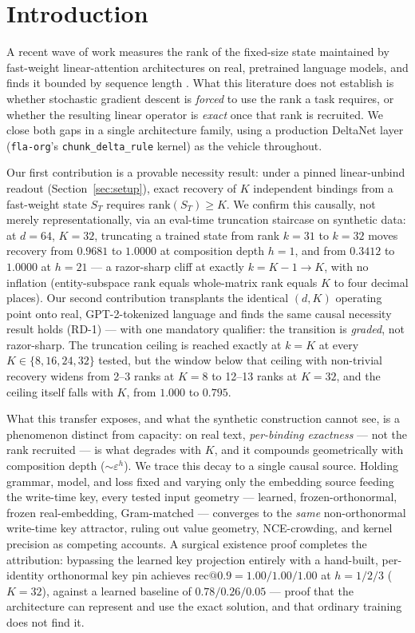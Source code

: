 \section{Introduction}
\label{sec:intro}

A recent wave of work measures the rank of the fixed-size state maintained
by fast-weight linear-attention architectures on real, pretrained language
models, and finds it bounded by sequence length \citep{nazari2026rank,
sun2026staterank}. What this literature does not establish is whether
stochastic gradient descent is \emph{forced} to use the rank a task
requires, or whether the resulting linear operator is \emph{exact} once
that rank is recruited. We close both gaps in a single architecture
family, using a production DeltaNet layer (\texttt{fla-org}'s
\texttt{chunk\_delta\_rule} kernel) as the vehicle throughout.

Our first contribution is a provable necessity result: under a pinned
linear-unbind readout (Section~\ref{sec:setup}), exact recovery of $K$
independent bindings from a fast-weight state $S_T$ requires
$\mathrm{rank}(S_T)\geq K$. We confirm this causally, not merely
representationally, via an eval-time truncation staircase on synthetic
data: at $d{=}64$, $K{=}32$, truncating a trained state from rank
$k{=}31$ to $k{=}32$ moves recovery from $0.9681$ to $1.0000$ at
composition depth $h{=}1$, and from $0.3412$ to $1.0000$ at $h{=}21$ --- a
razor-sharp cliff at exactly $k{=}K{-}1{\to}K$, with no inflation
(entity-subspace rank equals whole-matrix rank equals $K$ to four decimal
places). Our second contribution transplants the identical $(d,K)$
operating point onto real, GPT-2-tokenized language and finds the same
causal necessity result holds (RD-1) --- with one mandatory qualifier: the
transition is \emph{graded}, not razor-sharp. The truncation ceiling is
reached exactly at $k{=}K$ at every $K\in\{8,16,24,32\}$ tested, but the
window below that ceiling with non-trivial recovery widens from 2--3 ranks
at $K{=}8$ to 12--13 ranks at $K{=}32$, and the ceiling itself falls with
$K$, from $1.000$ to $0.795$.

What this transfer exposes, and what the synthetic construction cannot
see, is a phenomenon distinct from capacity: on real text,
\emph{per-binding exactness} --- not the rank recruited --- is what
degrades with $K$, and it compounds geometrically with composition depth
($\sim\varepsilon^h$). We trace this decay to a single causal source.
Holding grammar, model, and loss fixed and varying only the embedding
source feeding the write-time key, every tested input geometry ---
learned, frozen-orthonormal, frozen real-embedding, Gram-matched ---
converges to the \emph{same} non-orthonormal write-time key attractor,
ruling out value geometry, NCE-crowding, and kernel precision as
competing accounts. A surgical existence proof completes the attribution:
bypassing the learned key projection entirely with a hand-built,
per-identity orthonormal key pin achieves $\mathrm{rec@0.9}=
1.00/1.00/1.00$ at $h{=}1/2/3$ ($K{=}32$), against a learned baseline of
$0.78/0.26/0.05$ --- proof that the architecture can represent and use the
exact solution, and that ordinary training does not find it.

